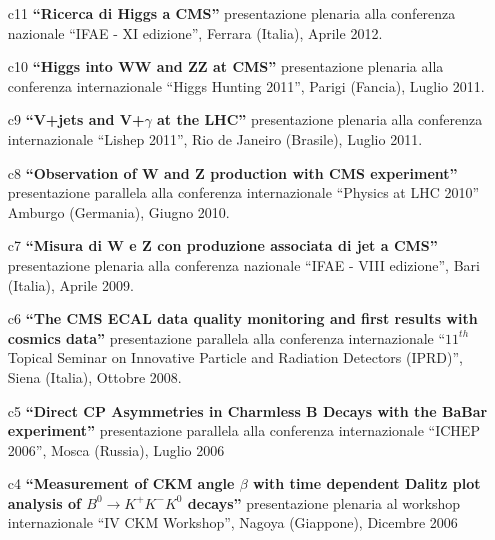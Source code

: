 \documentclass[11pt,twoside,a4paper]{article}
\begin{document}
\begin{enumerate}
\item [c11] \textbf{``Ricerca di Higgs a CMS''}
  presentazione plenaria alla conferenza nazionale ``IFAE - XI edizione'',
  Ferrara (Italia), Aprile 2012.
  \vspace{2mm}

\item [c10] \textbf{``Higgs into WW and ZZ at CMS''} presentazione
  plenaria alla conferenza internazionale ``Higgs Hunting 2011'',
  Parigi (Fancia), Luglio 2011.
  \vspace{2mm}

\item [c9] \textbf{``V+jets and V+$\gamma$ at the LHC''} presentazione
  plenaria alla conferenza internazionale ``Lishep 2011'', Rio de
  Janeiro (Brasile), Luglio 2011.
  \vspace{2mm}

\item [c8] \textbf{``Observation of W and Z production with CMS
  experiment'' } presentazione parallela alla conferenza
  internazionale ``Physics at LHC 2010'' Amburgo (Germania), Giugno
  2010.
  \vspace{2mm}

\item [c7] \textbf{``Misura di W e Z con produzione associata di jet a
  CMS''} presentazione plenaria alla conferenza nazionale ``IFAE -
  VIII edizione'', Bari (Italia), Aprile 2009.
  \vspace{2mm}

\item [c6] \textbf{``The CMS ECAL data quality monitoring and first
  results with cosmics data''} presentazione parallela alla conferenza
  internazionale ``$11^{th}$ Topical Seminar on Innovative Particle
  and Radiation Detectors (IPRD)'', Siena (Italia), Ottobre 2008.
  \vspace{2mm}

\item [c5] \textbf{``Direct CP Asymmetries in Charmless B Decays with the
  BaBar experiment''} presentazione parallela alla conferenza
  internazionale ``ICHEP 2006'', Mosca (Russia), Luglio 2006
  \vspace{2mm}

\item [c4] \textbf{``Measurement of CKM angle $\beta$ with time dependent
  Dalitz plot analysis of $B^0\rightarrow K^+K^-K^0$ decays''}
  presentazione plenaria al workshop internazionale ``IV CKM
  Workshop'', Nagoya (Giappone), Dicembre 2006
  \vspace{2mm}


\end{enumerate}
\end{document}
